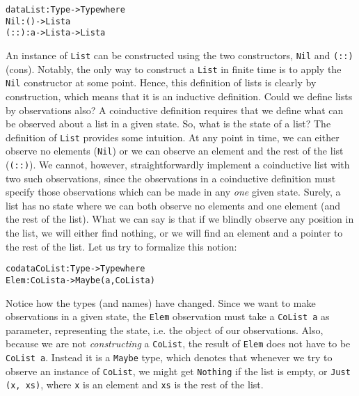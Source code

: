 \begin{alltt}
data List : Type -> Type where
  Nil  : () -> List a 
  (::) : a  -> List a -> List a
\end{alltt}

An instance of \texttt{List} can be constructed using the two constructors, \texttt{Nil} and \texttt{(::)} (cons). Notably, the only way to construct a \texttt{List} in finite time is to apply the \texttt{Nil} constructor at some point. Hence, this definition of lists is clearly by construction, which means that it is an inductive definition. Could we define lists by observations also? A coinductive definition requires that we define what can be observed about a list in a given state. So, what is the state of a list? The definition of \texttt{List} provides some intuition. At any point in time, we can either observe no elements (\texttt{Nil}) or we can observe an element and the rest of the list (\texttt{(::)}). We cannot, however, straightforwardly implement a coinductive list with two such observations, since the observations in a coinductive definition must specify those observations which can be made in any \emph{one} given state. Surely, a list has no state where we can both observe no elements and one element (and the rest of the list). What we can say is that if we blindly observe any position in the list, we will either find nothing, or we will find an element and a pointer to the rest of the list. Let us try to formalize this notion:

\begin{alltt}
codata CoList : Type -> Type where
  Elem : CoList a -> Maybe (a, CoList a)
\end{alltt}



Notice how the types (and names) have changed. Since we want to make observations in a given state, the \texttt{Elem} observation must take a \texttt{CoList a} as parameter, representing the state, i.e. the object of our observations. Also, because we are not \emph{constructing} a \texttt{CoList}, the result of \texttt{Elem} does not have to be \texttt{CoList~a}. Instead it is a \texttt{Maybe} type, which denotes that whenever we try to observe an instance of \texttt{CoList}, we might get \texttt{Nothing} if the list is empty, or \texttt{Just (x, xs)}, where \texttt{x} is an element and \texttt{xs} is the rest of the list. 

